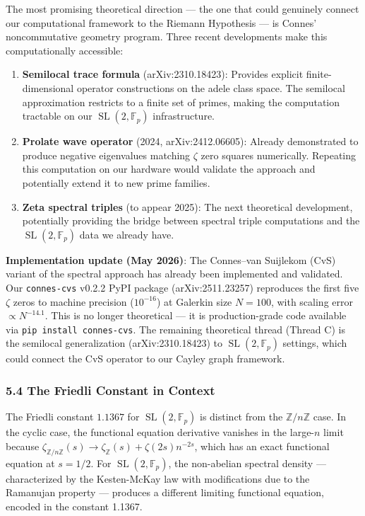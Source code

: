 \documentclass[
]{article}
\begin{document}
The most promising theoretical direction --- the one that could
genuinely connect our computational framework to the Riemann Hypothesis
--- is Connes' noncommutative geometry program. Three recent
developments make this computationally accessible:

\begin{enumerate}
\def\labelenumi{\arabic{enumi}.}
\item
  \textbf{Semilocal trace formula} (arXiv:2310.18423): Provides explicit
  finite-dimensional operator constructions on the adele class space.
  The semilocal approximation restricts to a finite set of primes,
  making the computation tractable on our
  \(\operatorname{SL}(2,\mathbb{F}_p)\) infrastructure.
\item
  \textbf{Prolate wave operator} (2024, arXiv:2412.06605): Already
  demonstrated to produce negative eigenvalues matching \(\zeta\) zero
  squares numerically. Repeating this computation on our hardware would
  validate the approach and potentially extend it to new prime families.
\item
  \textbf{Zeta spectral triples} (to appear 2025): The next theoretical
  development, potentially providing the bridge between spectral triple
  computations and the \(\operatorname{SL}(2,\mathbb{F}_p)\) data we
  already have.
\end{enumerate}

\textbf{Implementation update (May 2026)}: The Connes--van Suijlekom
(CvS) variant of the spectral approach has already been implemented and
validated. Our \texttt{connes-cvs} v0.2.2 PyPI package
(arXiv:2511.23257) reproduces the first five \(\zeta\) zeros to machine
precision (\(10^{-16}\)) at Galerkin size \(N=100\), with scaling error
\(\propto N^{-14.1}\). This is no longer theoretical --- it is
production-grade code available via \texttt{pip\ install\ connes-cvs}.
The remaining theoretical thread (Thread C) is the semilocal
generalization (arXiv:2310.18423) to
\(\operatorname{SL}(2,\mathbb{F}_p)\) settings, which could connect the
CvS operator to our Cayley graph framework.

\hypertarget{the-friedli-constant-in-context}{%
\subsubsection{5.4 The Friedli Constant in
Context}\label{the-friedli-constant-in-context}}

The Friedli constant \(1.1367\) for
\(\operatorname{SL}(2,\mathbb{F}_p)\) is distinct from the
\(\mathbb{Z}/n\mathbb{Z}\) case. In the cyclic case, the functional
equation derivative vanishes in the large-\(n\) limit because
\(\zeta_{\mathbb{Z}/n\mathbb{Z}}(s) \to \zeta_{\mathbb{Z}}(s) + \zeta(2s)n^{-2s}\),
which has an exact functional equation at \(s=1/2\). For
\(\operatorname{SL}(2,\mathbb{F}_p)\), the non-abelian spectral density
--- characterized by the Kesten-McKay law with modifications due to the
Ramanujan property --- produces a different limiting functional
equation, encoded in the constant 1.1367.
\end{document}
